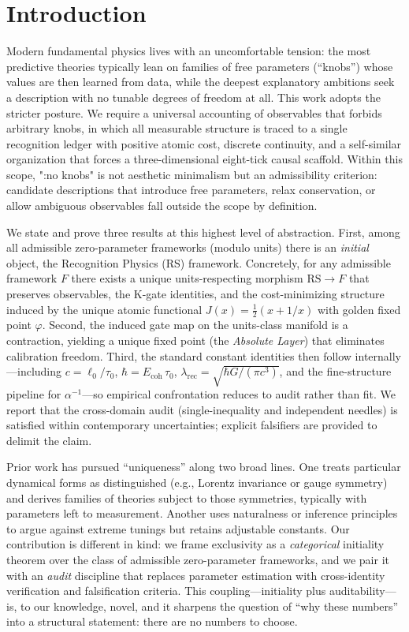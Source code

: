 \documentclass[11pt]{article}
\begin{document}
\section{Introduction}
Modern fundamental physics lives with an uncomfortable tension: the most predictive theories typically lean on families of free parameters (``knobs'') whose values are then learned from data, while the deepest explanatory ambitions seek a description with no tunable degrees of freedom at all. This work adopts the stricter posture. We require a universal accounting of observables that forbids arbitrary knobs, in which all measurable structure is traced to a single recognition ledger with positive atomic cost, discrete continuity, and a self\mbox{-}similar organization that forces a three\mbox{-}dimensional eight\mbox{-}tick causal scaffold. Within this scope, ":no knobs" is not aesthetic minimalism but an admissibility criterion: candidate descriptions that introduce free parameters, relax conservation, or allow ambiguous observables fall outside the scope by definition.

We state and prove three results at this highest level of abstraction. First, among all admissible zero\mbox{-}parameter frameworks (modulo units) there is an \emph{initial} object, the Recognition Physics (RS) framework. Concretely, for any admissible framework \(F\) there exists a unique units\mbox{-}respecting morphism \(\mathrm{RS}\to F\) that preserves observables, the K\mbox{-}gate identities, and the cost\mbox{-}minimizing structure induced by the unique atomic functional \(J(x)=\tfrac{1}{2}(x+1/x)\) with golden fixed point \(\varphi\). Second, the induced gate map on the units\mbox{-}class manifold is a contraction, yielding a unique fixed point (the \emph{Absolute Layer}) that eliminates calibration freedom. Third, the standard constant identities then follow internally---including \(c=\ell_0/\tau_0\), \(\hbar=E_{\mathrm{coh}}\,\tau_0\), \(\lambda_{\mathrm{rec}}=\sqrt{\hbar G/(\pi c^3)}\), and the fine\mbox{-}structure pipeline for \(\alpha^{-1}\)---so empirical confrontation reduces to audit rather than fit. We report that the cross\mbox{-}domain audit (single\mbox{-}inequality and independent needles) is satisfied within contemporary uncertainties; explicit falsifiers are provided to delimit the claim.

Prior work has pursued ``uniqueness'' along two broad lines. One treats particular dynamical forms as distinguished (e.g., Lorentz invariance or gauge symmetry) and derives families of theories subject to those symmetries, typically with parameters left to measurement. Another uses naturalness or inference principles to argue against extreme tunings but retains adjustable constants. Our contribution is different in kind: we frame exclusivity as a \emph{categorical} initiality theorem over the class of admissible zero\mbox{-}parameter frameworks, and we pair it with an \emph{audit} discipline that replaces parameter estimation with cross\mbox{-}identity verification and falsification criteria. This coupling---initiality plus auditability---is, to our knowledge, novel, and it sharpens the question of ``why these numbers'' into a structural statement: there are no numbers to choose.
\end{document}
